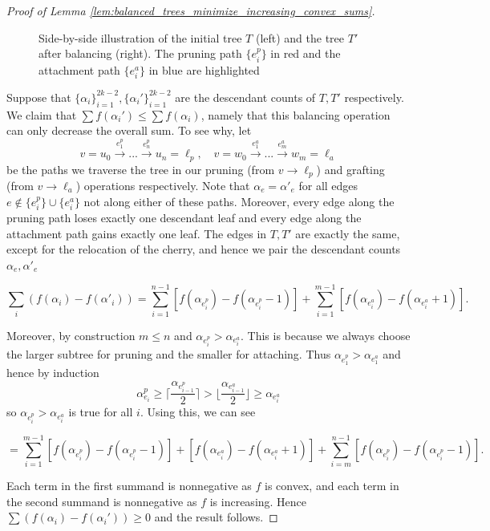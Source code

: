 \documentclass[10pt,a4paper]{amsart}
\renewcommand{\geq}{\geqslant}
\renewcommand{\leq}{\leqslant}
\begin{document}
\begin{proof}[Proof of Lemma \ref{lem:balanced_trees_minimize_increasing_convex_sums}]
\begin{figure}[h]
\begin{minipage}{0.48\textwidth}
\begin{tikzpicture}[scale=0.7]
\end{tikzpicture}
\end{minipage}

\caption{Side-by-side illustration of the initial tree $T$ (left) and the tree $T'$ after balancing (right). The pruning path $\{e_i^p\}$ in red and the attachment path $\{e_i^a\}$ in blue are highlighted}
\label{fig:balancing_algorithm_trees}
\end{figure}


Suppose that $\{\alpha_i\}_{i=1}^{2k-2}, \{\alpha_i'\}_{i=1}^{2k-2}$ are the descendant counts of $T, T'$ respectively. We claim that $\sum f(\alpha_i') \leq \sum f(\alpha_i)$, namely that this balancing operation can only decrease the overall sum. To see why, let
%
\[v = u_0 \xrightarrow{e^p_1} ... \xrightarrow{e^p_n} u_n = \ell_p, \quad v = w_0 \xrightarrow{e^a_1} ... \xrightarrow{e^a_m} w_m = \ell_a\]
%
\noindent be the paths we traverse the tree in our pruning (from $v \to \ell_p$) and grafting (from $v \to \ell_a$) operations respectively. Note that $\alpha_e = \alpha'_e$ for all edges $e \notin \{e_i^p\} \cup \{e_i^a\}$ not along either of these paths. Moreover, every edge along the pruning path loses exactly one descendant leaf and every edge along the attachment path gains exactly one leaf.  The edges in $T,T'$ are exactly the same, except for the relocation of the cherry, and hence we pair the descendant counts $\alpha_e, \alpha'_e$

\[\sum_i (f(\alpha_i) - f(\alpha'_i))=  \sum_{i=1}^{n-1} [f(\alpha_{e_i^p}) -  f(\alpha_{e_i^p} - 1)] + \sum_{i=1}^{m-1} [f(\alpha_{e_i^a}) -  f(\alpha_{e_i^a} + 1)].\]

\noindent Moreover,  by construction $m \leq n$ and $\alpha_{e_i^p} > \alpha_{e_i^a}$. This is because we always choose the larger subtree for pruning and the smaller for attaching. Thus $\alpha_{e_1^p} > \alpha_{e_1^a}$ and hence by induction
%
\[\alpha_{e_i}^p \geq \bigg\lceil \frac{\alpha_{e_{i-1}^p}}{2} \bigg \rceil > \bigg\lfloor \frac{\alpha_{e_{i-1}^a}}{2} \bigg \rfloor \geq \alpha_{e_i^a}\]
%
\noindent so $\alpha_{e_i^p} > \alpha_{e_i^a}$ is true for all $i$. Using this, we can see

\[= \sum_{i=1}^{m-1} [f(\alpha_{e_i^p}) -  f(\alpha_{e_i^p} - 1)] + [f(\alpha_{e_i^a}) -  f(\alpha_{e_i^a} + 1)] + \sum_{i=m}^{n-1} [f(\alpha_{e_i^p}) -  f(\alpha_{e_i^p} - 1)].\]

\noindent Each term in the first summand is nonnegative as $f$ is convex, and each term in the second summand is nonnegative as $f$ is increasing. Hence $\sum (f(\alpha_i) - f(\alpha_i')) \geq 0$ and the result follows.



\end{proof}
\end{document}

